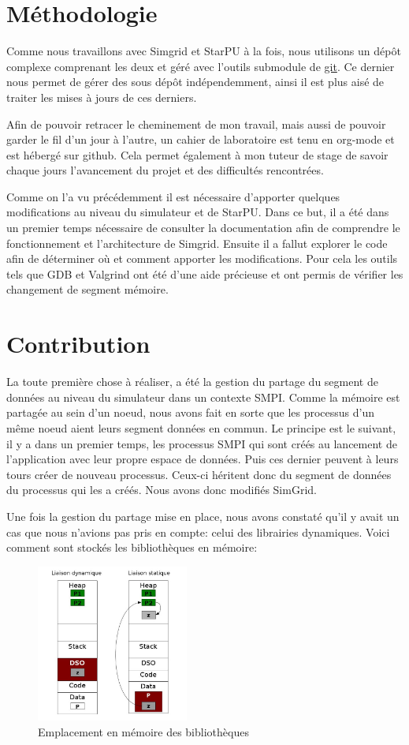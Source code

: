 \documentclass[smallextended]{svjour3}
\begin{document}
\section{Méthodologie}
\label{sec-4}
Comme nous travaillons avec Simgrid et StarPU à la fois, nous
utilisons un dépôt complexe comprenant les deux et géré avec
l'outils submodule de \href{https://github.com/swhatelse/Journal}{git}. Ce dernier nous permet de gérer des sous
dépôt indépendemment, ainsi il est plus aisé de traiter les mises à
jours de ces derniers.

Afin de pouvoir retracer le cheminement de mon travail, mais aussi
de pouvoir garder le fil d'un jour à l'autre, un cahier de
laboratoire est tenu en org-mode et est hébergé sur github. Cela permet
également à mon tuteur de stage de savoir chaque jours l'avancement
du projet et des difficultés rencontrées.

Comme on l'a vu précédemment il est nécessaire d'apporter quelques
modifications au niveau du simulateur et de StarPU. Dans ce but, il a été dans un
premier temps nécessaire de consulter la documentation afin de
comprendre le fonctionnement et l'architecture de Simgrid. Ensuite
il a fallut explorer le code afin de déterminer où et comment
apporter les modifications. Pour cela les outils tels que GDB et
Valgrind ont été d'une aide précieuse et ont permis de vérifier les
changement de segment mémoire.

\section{Contribution}
\label{sec-5}
La toute première chose à réaliser, a été la gestion du partage du
segment de données au niveau du simulateur dans un contexte
SMPI. Comme la mémoire est partagée au sein d'un noeud, nous avons
fait en sorte que les processus d'un même noeud aient leurs segment
données en commun. Le principe est le suivant, il y a dans un
premier temps, les processus SMPI qui sont 
créés au lancement de l'application avec leur propre espace de
données. Puis ces dernier peuvent à leurs tours créer de nouveau
processus. Ceux-ci héritent donc du segment de données du processus
qui les a créés. Nous avons donc modifiés SimGrid.

Une fois la gestion du partage mise en place, nous avons constaté
qu'il y avait un cas que nous n'avions pas pris en compte: celui des
librairies dynamiques. Voici comment sont stockés les bibliothèques
en mémoire:

\begin{figure}[htb]
\centering
\includegraphics[width=5cm]{./Img/StaticDyn.jpg}
\caption{\label{fig:2}Emplacement en mémoire des bibliothèques}
\end{figure}
\end{document}
